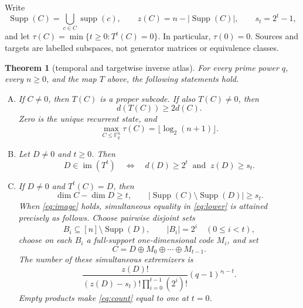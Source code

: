 \documentclass[a4paper,10pt]{amsart}
\newtheorem{theorem}{Theorem}
\theoremstyle{remark}
\newcommand{\F}{\mathbb F}
\newcommand{\supp}{\operatorname{supp}}
\newcommand{\Supp}{\operatorname{Supp}}
\newcommand{\im}{\operatorname{im}}
\begin{document}
Write
\[
 \Supp(C)=\bigcup_{c\in C}\supp(c),\qquad
 z(C)=n-|\Supp(C)|,
 \qquad s_t=2^t-1,
\]
and let $\tau(C)=\min\{t\geq0:T^t(C)=0\}$.  In particular,
$\tau(0)=0$.  Sources and targets are labelled subspaces, not generator
matrices or equivalence classes.

\begin{theorem}[temporal and targetwise inverse atlas]\label{thm:atlas}
For every prime power $q$, every $n\geq0$, and the map $T$ above, the
following statements hold.
\begin{enumerate}[(A)]
\item If $C\ne0$, then $T(C)$ is a proper subcode.  If also $T(C)\ne0$,
then
\begin{equation}\label{eq:doubling}
 d(T(C))\geq2d(C).
\end{equation}
Zero is the unique recurrent state, and
\begin{equation}\label{eq:height}
 \max_{C\leq\F_q^n}\tau(C)=\lfloor\log_2(n+1)\rfloor.
\end{equation}

\item Let $D\ne0$ and $t\geq0$.  Then
\begin{equation}\label{eq:image}
 D\in\im(T^t)
 \quad\Longleftrightarrow\quad
 d(D)\geq2^t\ \text{ and }\ z(D)\geq s_t.
\end{equation}

\item If $D\ne0$ and $T^t(C)=D$, then
\begin{equation}\label{eq:lower}
 \dim C-\dim D\geq t,
 \qquad
 |\Supp(C)\setminus\Supp(D)|\geq s_t.
\end{equation}
When \eqref{eq:image} holds, simultaneous equality in \eqref{eq:lower}
is attained precisely as follows.  Choose pairwise disjoint sets
\begin{equation}\label{eq:blocks}
 B_i\subseteq[n]\setminus\Supp(D),\qquad |B_i|=2^i
 \quad(0\leq i<t),
\end{equation}
choose on each $B_i$ a full-support one-dimensional code $M_i$, and set
\begin{equation}\label{eq:source}
 C=D\oplus M_0\oplus\cdots\oplus M_{t-1}.
\end{equation}
The number of these simultaneous extremizers is
\begin{equation}\label{eq:count}
 \frac{z(D)!}{(z(D)-s_t)!\prod_{i=0}^{t-1}(2^i)!}
 (q-1)^{s_t-t}.
\end{equation}
Empty products make \eqref{eq:count} equal to one at $t=0$.
\end{enumerate}
\end{theorem}
\end{document}
